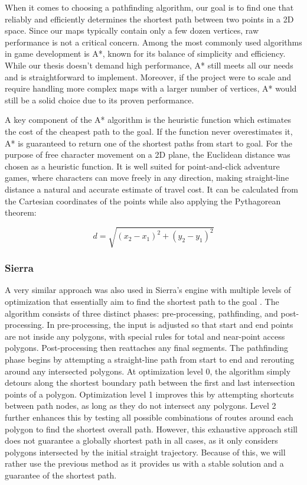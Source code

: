 When it comes to choosing a pathfinding algorithm, our goal is to find one that reliably and efficiently determines the shortest path between two points in a 2D space. Since our maps typically contain only a few dozen vertices, raw performance is not a critical concern. Among the most commonly used algorithms in game development is A*, known for its balance of simplicity and efficiency. While our thesis doesn’t demand high performance, A* still meets all our needs and is straightforward to implement. Moreover, if the project were to scale and require handling more complex maps with a larger number of vertices, A* would still be a solid choice due to its proven performance. 

A key component of the A* algorithm is the heuristic function which estimates the cost of the cheapest path to the goal. If the function never overestimates it, A* is guaranteed to return one of the shortest paths from start to goal. For the purpose of free character movement on a 2D plane, the Euclidean distance was chosen as a heuristic function. It is well suited for point-and-click adventure games, where characters can move freely in any direction, making straight-line distance a natural and accurate estimate of travel cost.  It can be calculated from the Cartesian coordinates of the points while also applying the Pythagorean theorem:

\[
d = \sqrt{(x_2 - x_1)^2 + (y_2 - y_1)^2}
\]

\subsubsection{Sierra}
A very similar approach was also used in Sierra's engine with multiple levels of optimization that essentially aim to find the shortest path to the goal \cite{ScummVM-patent}. The algorithm consists of three distinct phases: pre-processing, pathfinding, and post-processing. In pre-processing, the input is adjusted so that start and end points are not inside any polygons, with special rules for total and near-point access polygons. Post-processing then reattaches any final segments. The pathfinding phase begins by attempting a straight-line path from start to end and rerouting around any intersected polygons. At optimization level 0, the algorithm simply detours along the shortest boundary path between the first and last intersection points of a polygon. Optimization level 1 improves this by attempting shortcuts between path nodes, as long as they do not intersect any polygons. Level 2 further enhances this by testing all possible combinations of routes around each polygon to find the shortest overall path. However, this exhaustive approach still does not guarantee a globally shortest path in all cases, as it only considers polygons intersected by the initial straight trajectory. Because of this, we will rather use the previous method as it provides us with a stable solution and a guarantee of the shortest path.


